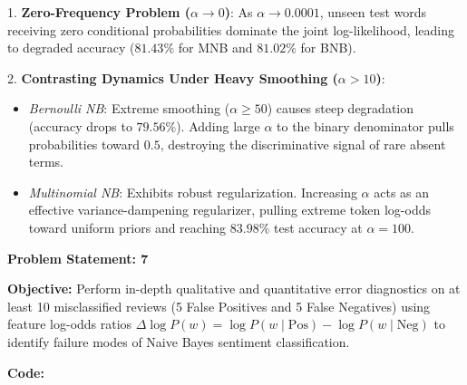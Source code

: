 \documentclass[12pt]{article}
\begin{document}
1. \textbf{Zero-Frequency Problem ($\alpha \to 0$)}: As $\alpha \to 0.0001$, unseen test words receiving zero conditional probabilities dominate the joint log-likelihood, leading to degraded accuracy ($81.43\%$ for MNB and $81.02\%$ for BNB).

2. \textbf{Contrasting Dynamics Under Heavy Smoothing ($\alpha > 10$)}:
\begin{itemize}
    \item \textit{Bernoulli NB}: Extreme smoothing ($\alpha \ge 50$) causes steep degradation (accuracy drops to $79.56\%$). Adding large $\alpha$ to the binary denominator pulls probabilities toward $0.5$, destroying the discriminative signal of rare absent terms.
    \item \textit{Multinomial NB}: Exhibits robust regularization. Increasing $\alpha$ acts as an effective variance-dampening regularizer, pulling extreme token log-odds toward uniform priors and reaching $83.98\%$ test accuracy at $\alpha = 100$.
\end{itemize}

\vspace{0.4cm}


\textbf{Problem Statement: 7}

\textbf{Objective:} Perform in-depth qualitative and quantitative error diagnostics on at least 10 misclassified reviews (5 False Positives and 5 False Negatives) using feature log-odds ratios $\Delta \log P(w) = \log P(w \mid \text{Pos}) - \log P(w \mid \text{Neg})$ to identify failure modes of Naive Bayes sentiment classification.

\vspace{0.2cm}
\textbf{Code:}
\end{document}
